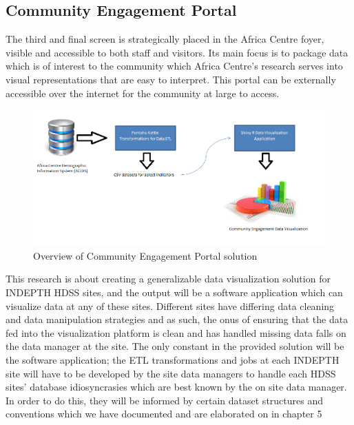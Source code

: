 \subsection{Community Engagement Portal}

The third and final screen is strategically placed in the Africa Centre foyer, visible and accessible to both staff and visitors. Its main focus is to package data which is of interest to the community which Africa Centre’s research serves into visual representations that are easy to interpret. This portal can be externally accessible over the internet for the community at large to access.

\begin{figure}[!ht] 
\centering
\includegraphics[scale=0.4]{./Chapter4/images/communityportaloverview}
\caption{Overview of Community Engagement Portal solution }
\label{fig3}
\end{figure}

This research is about creating a generalizable data visualization solution for INDEPTH HDSS sites, and the output will be a software application which can visualize data at any of these sites. Different sites have differing data cleaning and data manipulation strategies and as such, the onus of ensuring that the data fed into the visualization platform is clean and has handled missing data falls on the data manager at the site. The only constant in the provided solution will be the software application; the ETL transformations and jobs at each INDEPTH site will have to be developed by the site data managers to handle each HDSS sites’ database idiosyncrasies which are best known by the on site data manager. In order to do this, they will be informed by certain dataset structures and conventions which we have documented and are elaborated on in chapter 5
